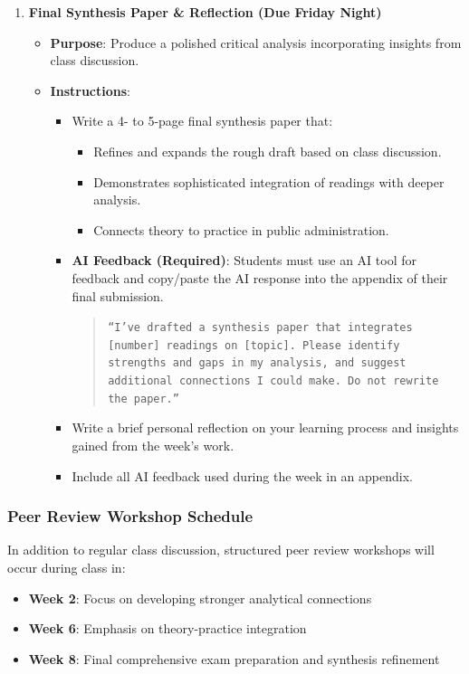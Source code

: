 \documentclass[12pt, letterpaper]{article}
\begin{document}
\begin{enumerate}
    \item \textbf{Final Synthesis Paper \& Reflection (Due Friday Night)}
    \begin{itemize}
        \item \textbf{Purpose}: Produce a polished critical analysis incorporating insights from class discussion.
        \item \textbf{Instructions}:
        \begin{itemize}
            \item Write a 4- to 5-page final synthesis paper that:
            \begin{itemize}
                \item Refines and expands the rough draft based on class discussion.
                \item Demonstrates sophisticated integration of readings with deeper analysis.
                \item Connects theory to practice in public administration.
            \end{itemize}
            \item \textbf{AI Feedback (Required)}: Students must use an AI tool for feedback and copy/paste the AI response into the appendix of their final submission.  
            \begin{quote}
                \texttt{``I've drafted a synthesis paper that integrates [number] readings on [topic]. Please identify strengths and gaps in my analysis, and suggest additional connections I could make. Do not rewrite the paper.''}
            \end{quote}
            \item Write a brief personal reflection on your learning process and insights gained from the week's work.
            \item Include all AI feedback used during the week in an appendix.
        \end{itemize}
    \end{itemize}
\end{enumerate}

\subsubsection*{Peer Review Workshop Schedule}

In addition to regular class discussion, structured peer review workshops will occur during class in:
\begin{itemize}
    \item \textbf{Week 2}: Focus on developing stronger analytical connections
    \item \textbf{Week 6}: Emphasis on theory-practice integration
    \item \textbf{Week 8}: Final comprehensive exam preparation and synthesis refinement
\end{itemize}
\end{document}

